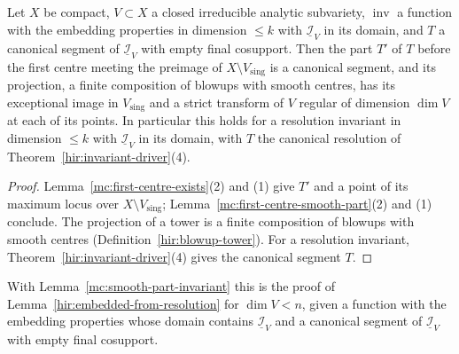 \begin{theorem}
\label{mc:embedded-from-first-centre}
\leanok
Let \(X\) be compact, \(V\subset X\) a closed irreducible analytic subvariety, \(\operatorname{inv}\) a function with the embedding properties in dimension
\(\le k\) with \(\underline{\mathcal I}_V\) in its domain, and \(T\) a canonical segment of \(\underline{\mathcal I}_V\) with empty final cosupport. Then the part \(T'\) of
\(T\) before the first centre meeting the preimage of \(X\setminus V_{\mathrm{sing}}\) is a canonical segment, and its projection, a finite composition of blowups with
smooth centres, has its exceptional image in \(V_{\mathrm{sing}}\) and a strict transform of \(V\) regular of dimension \(\dim V\) at each of its points. In
particular this holds for a resolution invariant in dimension \(\le k\) with \(\underline{\mathcal I}_V\) in its domain, with \(T\) the canonical resolution of
Theorem~\ref{hir:invariant-driver}(4).
\end{theorem}
\begin{proof}
\leanok
Lemma~\ref{mc:first-centre-exists}(2) and (1) give \(T'\) and a point of its maximum locus over \(X\setminus V_{\mathrm{sing}}\); Lemma~\ref{mc:first-centre-smooth-part}(2)
and (1) conclude. The projection of a tower is a finite composition of blowups with smooth centres (Definition~\ref{hir:blowup-tower}). For a resolution
invariant, Theorem~\ref{hir:invariant-driver}(4) gives the canonical segment \(T\).
\end{proof}
With Lemma~\ref{mc:smooth-part-invariant} this is the proof of Lemma~\ref{hir:embedded-from-resolution} for \(\dim V<n\), given a function with the embedding properties
whose domain contains \(\underline{\mathcal I}_V\) and a canonical segment of \(\underline{\mathcal I}_V\) with empty final cosupport.

